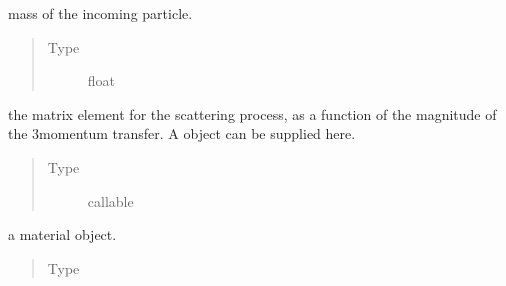 \documentclass[letterpaper,10pt,english]{sphinxmanual}
\begin{document}
\begin{fulllineitems}
\begin{fulllineitems}
\label{\detokenize{code_structure:scdc.initial.distribution.integral.RateIntegrator.m1}}
mass of the incoming particle.
\begin{quote}\begin{description}
\item[{Type}] \leavevmode
float

\end{description}\end{quote}

\end{fulllineitems}


\begin{fulllineitems}
\label{\detokenize{code_structure:scdc.initial.distribution.integral.RateIntegrator.matrix_element}}
the matrix element for the scattering
process, as a function of the magnitude of the 3\sphinxhyphen{}momentum transfer.
A  object can be supplied here.
\begin{quote}\begin{description}
\item[{Type}] \leavevmode
callable

\end{description}\end{quote}

\end{fulllineitems}


\begin{fulllineitems}
\label{\detokenize{code_structure:scdc.initial.distribution.integral.RateIntegrator.material}}
a material object.
\begin{quote}\begin{description}
\item[{Type}] \leavevmode
{}

\end{description}\end{quote}


\end{fulllineitems}
\end{fulllineitems}
\end{document}
